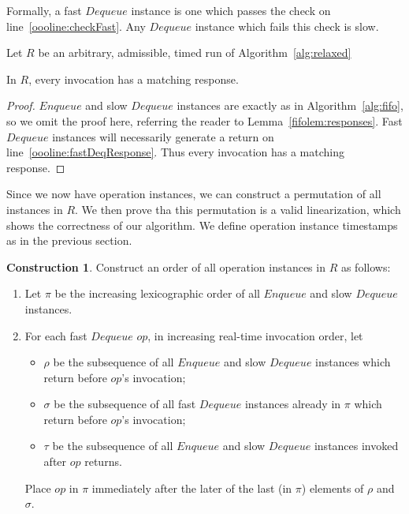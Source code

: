 \documentclass[a4paper,anonymous,USenglish]{lipics-v2021} %
\theoremstyle{definition}
\newtheorem{construction}{Construction}
\begin{document}
Formally, a fast $Dequeue$ instance is one which passes the check on line~\ref{oooline:checkFast}.  Any $Dequeue$ instance which fails this check is slow.

Let $R$ be an arbitrary, admissible, timed run of Algorithm~\ref{alg:relaxed}

\begin{lemma}
 In $R$, every invocation has a matching response.
\end{lemma}

\begin{proof}
  $Enqueue$ and slow $Dequeue$ instances are exactly as in Algorithm~\ref{alg:fifo}, so we omit the proof here, referring the reader to Lemma~\ref{fifolem:responses}.  Fast $Dequeue$ instances will necessarily generate a return on line~\ref{oooline:fastDeqResponse}.  Thus every invocation has a matching response.
\end{proof}

Since we now have operation instances, we can construct a permutation of all instances in $R$.  We then prove tha this permutation is a valid linearization, which shows the correctness of our algorithm.  We define operation instance timestamps as in the previous section.

\begin{construction}\label{constr:relaxed}
  Construct an order of all operation instances in $R$ as follows:
  \begin{enumerate}
  \item Let $\pi$ be the increasing lexicographic order of all $Enqueue$ and slow $Dequeue$ instances. \label{orderSlow}
  \item For each fast $Dequeue$ $op$, in increasing real-time invocation order, let
    \begin{itemize}
    \item $\rho$ be the subsequence of all $Enqueue$ and slow $Dequeue$ instances which return before $op$'s invocation;
    \item $\sigma$ be the subsequence of all fast $Dequeue$ instances already in $\pi$ which return before $op$'s invocation;
    \item $\tau$ be the subsequence of all $Enqueue$ and slow $Dequeue$ instances invoked after $op$ returns.
    \end{itemize}
    Place $op$ in $\pi$ immediately after the later of the last (in $\pi$) elements of $\rho$ and $\sigma$.\label{orderFast}
  \end{enumerate}
\end{construction}
\end{document}
